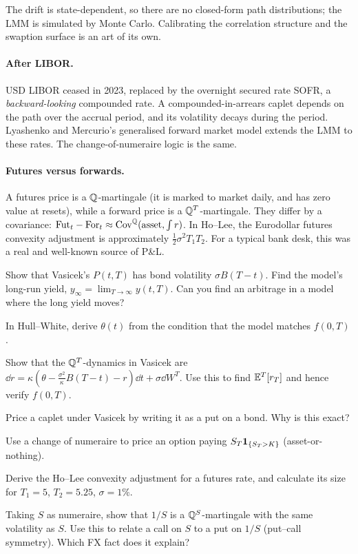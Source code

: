 The drift is state-dependent, so there are no closed-form path distributions; the LMM is simulated by Monte Carlo. Calibrating the correlation structure and the swaption surface is an art of its own.

\paragraph{After LIBOR.} USD LIBOR ceased in 2023, replaced by the overnight secured rate SOFR, a \emph{backward-looking} compounded rate. A compounded-in-arrears caplet depends on the path over the accrual period, and its volatility decays during the period. Lyashenko and Mercurio's generalised forward market model extends the LMM to these rates. The change-of-numeraire logic is the same.

\paragraph{Futures versus forwards.} A futures price is a $\mathbb{Q}$-martingale (it is marked to market daily, and has zero value at resets), while a forward price is a $\mathbb{Q}^T$-martingale. They differ by a covariance: $\text{Fut}_t-\text{For}_t\approx\operatorname{Cov}^{\mathbb{Q}}(\text{asset},\int r)$. In Ho--Lee, the Eurodollar futures convexity adjustment is approximately $\tfrac12\sigma^2T_1T_2$. For a typical bank desk, this was a real and well-known source of P\&L.

\begin{exercises}
\item Show that Vasicek's $P(t,T)$ has bond volatility $\sigma B(T-t)$. Find the model's long-run yield, $y_\infty=\lim_{T\to\infty}y(t,T)$. Can you find an arbitrage in a model where the long yield moves?
\item In Hull--White, derive $\theta(t)$ from the condition that the model matches $f(0,T)$.
\item Show that the $\mathbb{Q}^{T}$-dynamics in Vasicek are $\dd r=\kappa(\theta-\frac{\sigma^2}{\kappa}B(T-t)-r)\dd t+\sigma\dd W^T$. Use this to find $\mathbb{E}^T[r_T]$ and hence verify $f(0,T)$.
\item Price a caplet under Vasicek by writing it as a put on a bond. Why is this exact?
\item Use a change of numeraire to price an option paying $S_T\mathbf{1}_{\{S_T>K\}}$ (asset-or-nothing).
\item Derive the Ho--Lee convexity adjustment for a futures rate, and calculate its size for $T_1=5$, $T_2=5.25$, $\sigma=1\%$.
\item Taking $S$ as numeraire, show that $1/S$ is a $\mathbb{Q}^S$-martingale with the same volatility as $S$. Use this to relate a call on $S$ to a put on $1/S$ (put--call symmetry). Which FX fact does it explain?
\end{exercises}

